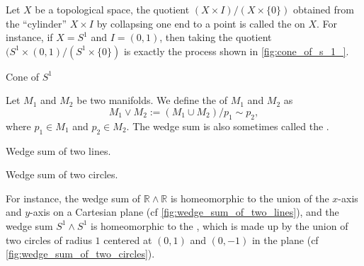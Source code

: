 \documentclass[notoc,notitlepage]{tufte-book}
\begin{document}
\begin{eg}
  Let $X$ be a topological space, the quotient $(X \times I) / (X \times \{ 0 \})$ obtained from
  the ``cylinder'' $X \times I$ by collapsing one end to a point is called the  on
  $X$. For instance, if $X = S^1$ and $I = (0, 1)$, then taking the quotient
  $(S^1 \times (0, 1)/(S^1 \times \{ 0 \})$ is exactly the process shown in
  \cref{fig:cone_of_s_1_}.
  \begin{marginfigure}
    \centering
    \caption{Cone of $S^1$}\label{fig:cone_of_s_1_}
  \end{marginfigure}
\end{eg}

\begin{eg}\label{eg:wedge_sum_of_manifolds}
  Let $M_1$ and $M_2$ be two manifolds. We define the  of $M_1$ and $M_2$ as
  \begin{equation*}
    M_1 \lor M_2 := (M_1 \cup M_2) / p_1 \sim p_2,
  \end{equation*}
  where $p_1 \in M_1$ and $p_2 \in M_2$. The wedge sum is also sometimes called the
  .
  \begin{marginfigure}
    \centering
    \caption{Wedge sum of two lines.}\label{fig:wedge_sum_of_two_lines}
  \end{marginfigure}
  \begin{marginfigure}
    \centering
    \caption{Wedge sum of two circles.}\label{fig:wedge_sum_of_two_circles}
  \end{marginfigure}
  For instance, the wedge sum of $\mathbb{R} \wedge \mathbb{R}$ is homeomorphic to the union
  of the $x$-axis and $y$-axis on a Cartesian plane (cf \cref{fig:wedge_sum_of_two_lines}),
  and the wedge sum $S^1 \wedge S^1$ is homeomorphic to the ,
  which is made up by the union of two circles of radius $1$ centered at $(0, 1)$ and $(0, -1)$
  in the plane (cf \cref{fig:wedge_sum_of_two_circles}).
\end{eg}
\end{document}
